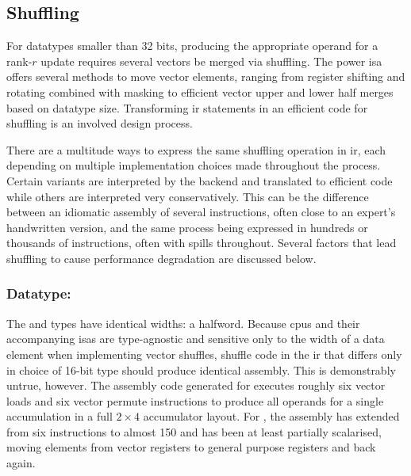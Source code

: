 \documentclass[\main/thesis.tex]{subfiles}
\begin{document}
\subsection{Shuffling}
For datatypes smaller than 32 bits, producing the appropriate operand for a rank-$r$ update requires several vectors be merged via shuffling.
The \gls{power} \gls{isa} offers several methods to move vector elements, ranging from register shifting and rotating combined with masking to efficient vector upper and lower half merges based on datatype size.
Transforming \gls{ir} statements in an efficient code for shuffling is an involved design process.

There are a multitude ways to express the same shuffling operation in \gls{ir}, each depending on multiple implementation choices made throughout the process.
Certain variants are interpreted by the backend and translated to efficient code while others are interpreted very conservatively.
This can be the difference between an idiomatic assembly of several instructions, often close to an expert's handwritten version, and the same process being expressed in hundreds or thousands of instructions, often with \glspl{spill} throughout.
Several factors that lead shuffling to cause performance degradation are discussed below.

\subsubsection{Datatype: \texorpdfstring{}{half}}
\label{sec:halfShuffle}
The  and  types have identical widths: a halfword.
Because \glspl{cpu} and their accompanying \glspl{isa} are type-agnostic and sensitive only to the width of a data element when implementing vector shuffles, shuffle code in the \gls{ir} that differs only in choice of 16-bit type should produce identical assembly.
This is demonstrably untrue, however.
The assembly code generated for  executes roughly six vector loads and six vector permute instructions to produce all operands for a single accumulation in a full $2 \times 4$ accumulator layout.
For , the assembly has extended from six instructions to almost 150 and has been at least partially scalarised, moving elements from vector registers to general purpose registers and back again.
\end{document}
